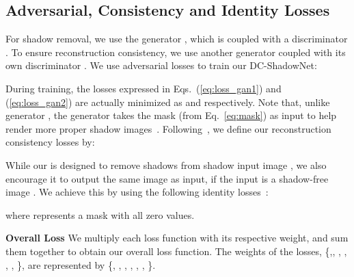\documentclass[10pt,twocolumn,letterpaper]{article}
\begin{document}
\vspace{0.2cm}
\subsection{Adversarial, Consistency and Identity Losses}
For shadow removal, we use the generator , which is coupled with a discriminator . To ensure reconstruction consistency, we use another generator  coupled with its own discriminator . We use adversarial losses to train our DC-ShadowNet:

During training, the losses expressed in Eqs.~(\ref{eq:loss_gan1}) and (\ref{eq:loss_gan2}) are actually minimized as   and   respectively. 
Note that, unlike generator , the generator   takes the mask  (from Eq.~\ref{eq:mask}) as input to help render  more proper shadow images~\cite{Hu19}. Following~\cite{Zhu17,yan2020optical}, we define our reconstruction consistency losses by:

While our  is designed to remove shadows from shadow input image , we also encourage it to output the same image as input, if the input is a shadow-free image . We achieve this by using the following identity losses~\cite{Zhu17}:

where  represents a mask with all zero values. 

\vspace{0.3cm}
\noindent \textbf{Overall Loss}
We multiply each loss function with its respective weight, and sum them together to obtain our overall loss function. The weights of the losses, \{,, , , , , \}, are represented by \{, , , , , , \}.
\end{document}
